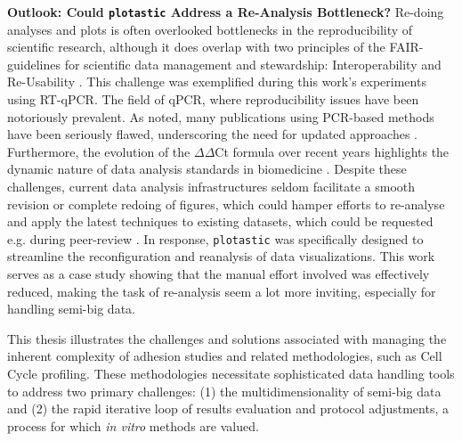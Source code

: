 \textbf{Outlook: Could \texttt{plotastic} Address a Re-Analysis Bottleneck?}
Re-doing analyses and plots is often overlooked bottlenecks in the
reproducibility of scientific research, although it does overlap with two
principles of the FAIR-guidelines for scientific data management and
stewardship: Interoperability and Re-Usability
\cite{wilkinsonFAIRGuidingPrinciples2016}. This challenge was exemplified during
this work's experiments using RT-qPCR. The field of qPCR, where reproducibility
issues have been notoriously prevalent. As
\citet{bustinReproducibilityBiomedicalResearch2014} noted, many publications
using PCR-based methods have been seriously flawed, underscoring the need for
updated approaches \cite{bustinNeedTransparencyGood2013,
ruiz-villalbaUseMisuseCq2021}. Furthermore, the evolution of the
$\Delta\Delta$Ct formula over recent years highlights the dynamic nature of data
analysis standards in biomedicine \cite{pfafflNewMathematicalModel2001a,
ramakersAssumptionfreeAnalysisQuantitative2003,
ruijterEfficiencyCorrectionRequired2021}. Despite these challenges, current data
analysis infrastructures seldom facilitate a smooth revision or complete redoing
of figures, which could hamper efforts to re-analyse and apply the latest
techniques to existing datasets, which could be requested e.g. during
peer-review \cite{wilkinsonFAIRGuidingPrinciples2016}. In response,
\texttt{plotastic} was specifically designed to streamline the reconfiguration
and reanalysis of data visualizations. This work serves as a case study showing
that  the manual effort
involved was effectively reduced, making the task of re-analysis seem a lot more
inviting, especially for handling semi-big data.





%
\label{sec:discussion_conclusion_semi_automation}%
This thesis illustrates the challenges and solutions associated with managing
the inherent complexity of adhesion studies and related methodologies, such as
Cell Cycle profiling. These methodologies necessitate sophisticated data
handling tools to address two primary challenges: (1) the multidimensionality of
semi-big data and (2) the rapid iterative loop of results evaluation and protocol
adjustments, a process for which \textit{in vitro} methods are valued.

